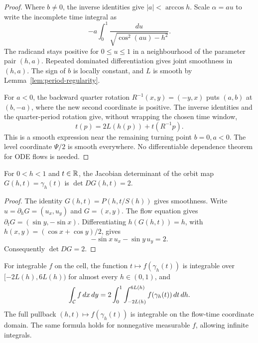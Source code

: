 \begin{proof}
\leanok
Where $b\ne0$, the inverse identities give $|a|<\arccos h$. Scale
$\alpha=au$ to write the incomplete time integral as
\[
  -a\int_0^1\frac{du}{\sqrt{\cos^2(au)-h^2}}.
\]
The radicand stays positive for $0\le u\le1$ in a neighbourhood of the
parameter pair $(h,a)$. Repeated dominated differentiation gives joint
smoothness in $(h,a)$. The sign of $b$ is locally constant, and $L$ is
smooth by Lemma~\ref{lem:period-regularity}.

For $a<0$, the backward quarter rotation $R^{-1}(x,y)=(-y,x)$ puts
$(a,b)$ at $(b,-a)$, where the new second coordinate is positive.
The inverse identities and the quarter-period rotation give, without
wrapping the chosen time window,
\[
  t(p)=2L(h(p))+t(R^{-1}p).
\]
This is a smooth expression near the remaining turning point
$b=0,a<0$. The level coordinate $\Psi/2$ is smooth everywhere.
No differentiable dependence theorem for ODE flows is needed.
\end{proof}

\begin{lemma}
\label{lem:orbit-jacobian}
\leanok
For $0<h<1$ and $t\in\mathbb{R}$, the Jacobian determinant of the orbit map
$G(h,t)=\gamma_h(t)$ is $\det DG(h,t)=2$.
\end{lemma}

\begin{proof}
\leanok
The identity $G(h,t)=P(h,t/S(h))$ gives smoothness.
Write $u=\partial_hG=(u_x,u_y)$ and $G=(x,y)$. The flow equation gives
$\partial_tG=(\sin y,-\sin x)$. Differentiating
$h(G(h,t))=h$, with $h(x,y)=(\cos x+\cos y)/2$, gives
\[
  -\sin x\,u_x-\sin y\,u_y=2.
\]
Consequently $\det DG=2$.
\end{proof}

\begin{lemma}
\label{lem:orbit-coordinates-area}
\leanok
For integrable $f$ on the cell, the function
$t\mapsto f(\gamma_h(t))$ is integrable over $[-2L(h),6L(h))$ for
almost every $h\in(0,1)$, and
\[
  \int_{\mathcal{C}}f\,dx\,dy
  =2\int_0^1\int_{-2L(h)}^{6L(h)}f(\gamma_h(t))\,dt\,dh .
\]
The full pullback $(h,t)\mapsto f(\gamma_h(t))$ is integrable on the
flow-time coordinate domain. The same formula holds for nonnegative
measurable $f$, allowing infinite integrals.
\end{lemma}

